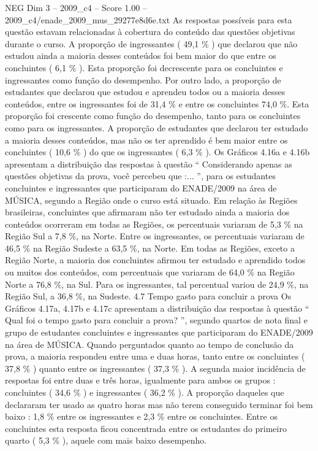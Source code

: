 \begin{textsample}{NEG Dim 3 – 2009\_c4 – Score 1.00 – 2009\_c4/enade\_2009\_mus\_29277e8d6e.txt}
As respostas possíveis para esta questão estavam relacionadas à cobertura do conteúdo das questões objetivas durante o curso.
A proporção de ingressantes ( 49,1 \% ) que declarou que não estudou ainda a maioria desses conteúdos foi bem maior do que entre os concluintes ( 6,1 \% ).
Esta proporção foi decrescente para os concluintes e ingressantes como função do desempenho.
Por outro lado, a proporção de estudantes que declarou que estudou e aprendeu todos ou a maioria desses conteúdos, entre os ingressantes foi de 31,4 \% e entre os concluintes 74,0 \%.
Esta proporção foi crescente como função do desempenho, tanto para os concluintes como para os ingressantes.
A proporção de estudantes que declarou ter estudado a maioria desses conteúdos, mas não os ter aprendido é bem maior entre os concluintes ( 10,6 \% ) do que os ingressantes ( 6,3 \% ).
Os Gráficos 4.16a e 4.16b apresentam a distribuição das respostas à questão “ Considerando apenas as questões objetivas da prova, você percebeu que :... ”, para os estudantes concluintes e ingressantes que participaram do ENADE/2009 na área de MÚSICA, segundo a Região onde o curso está situado.
Em relação às Regiões brasileiras, concluintes que afirmaram não ter estudado ainda a maioria dos conteúdos ocorreram em todas as Regiões, os percentuais variaram de 5,3 \% na Região Sul a 7,8 \%, na Norte.
Entre os ingressantes, os percentuais variaram de 46,5 \% na Região Sudeste a 63,5 \%, na Norte.
Em todas as Regiões, exceto a Região Norte, a maioria dos concluintes afirmou ter estudado e aprendido todos ou muitos dos conteúdos, com percentuais que variaram de 64,0 \% na Região Norte a 76,8 \%, na Sul.
Para os ingressantes, tal percentual variou de 24,9 \%, na Região Sul, a 36,8 \%, na Sudeste. 4.7 Tempo gasto para concluir a prova Os Gráficos 4.17a, 4.17b e 4.17c apresentam a distribuição das respostas à questão “ Qual foi o tempo gasto para concluir a prova? ”, segundo quartos de nota final e grupo de estudantes concluintes e ingressantes que participaram do ENADE/2009 na área de MÚSICA.
Quando perguntados quanto ao tempo de conclusão da prova, a maioria respondeu entre uma e duas horas, tanto entre os concluintes ( 37,8 \% ) quanto entre os ingressantes ( 37,3 \% ).
A segunda maior incidência de respostas foi entre duas e três horas, igualmente para ambos os grupos : concluintes ( 34,6 \% ) e ingressantes ( 36,2 \% ).
A proporção daqueles que declararam ter usado as quatro horas mas não terem conseguido terminar foi bem baixo : 1,8 \% entre os ingressantes e 2,3 \% entre os concluintes.
Entre os concluintes esta resposta ficou concentrada entre os estudantes do primeiro quarto ( 5,3 \% ), aquele com mais baixo desempenho.

\end{textsample}
